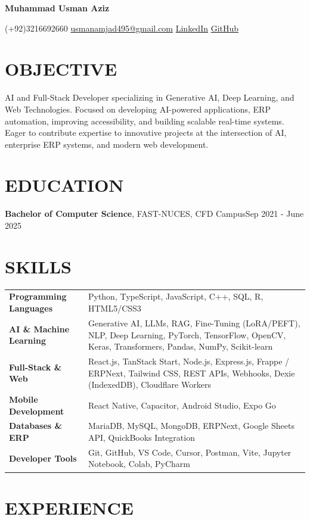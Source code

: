 \documentclass[11pt]{article}
\newcommand{\name}[1]{\begin{center}{\Huge \bfseries #1}\end{center}}
\newcommand{\address}[1]{\begin{center}\small #1\end{center}\vspace{-8pt}}
\newcommand{\rSection}[1]{\section{\uppercase{#1}}}
\begin{document}
\pagestyle{empty}

\name{Muhammad Usman Aziz}

\address{
\faPhone{} (+92)3216692660 \quad
\faEnvelope{} \href{mailto:usmanamjad495@gmail.com}{usmanamjad495@gmail.com} \quad
\faLinkedin{} \href{https://www.linkedin.com/in/usmanamjad41/}{LinkedIn} \quad
\faGithub{} \href{https://github.com/MaAn-41}{GitHub}
}

\rSection{Objective}
AI and Full-Stack Developer specializing in Generative AI, Deep Learning, and Web Technologies. Focused on developing AI-powered applications, ERP automation, improving accessibility, and building scalable real-time systems. Eager to contribute expertise to innovative projects at the intersection of AI, enterprise ERP systems, and modern web development.

\rSection{Education}
{\bf Bachelor of Computer Science}, FAST-NUCES, CFD Campus\hfill {Sep 2021 - June 2025}

\vspace{-1em}

\rSection{Skills}
\begin{tabularx}{\textwidth}{ @{} >{\bfseries}l @{\hspace{3ex}} X @{} }
Programming Languages & Python, TypeScript, JavaScript, C++, SQL, R, HTML5/CSS3 \\
AI \& Machine Learning & Generative AI, LLMs, RAG, Fine-Tuning (LoRA/PEFT), NLP, Deep Learning, PyTorch, TensorFlow, OpenCV, Keras, Transformers, Pandas, NumPy, Scikit-learn \\
Full-Stack \& Web & React.js, TanStack Start, Node.js, Express.js, Frappe / ERPNext, Tailwind CSS, REST APIs, Webhooks, Dexie (IndexedDB), Cloudflare Workers \\
Mobile Development & React Native, Capacitor, Android Studio, Expo Go \\
Databases \& ERP & MariaDB, MySQL, MongoDB, ERPNext, Google Sheets API, QuickBooks Integration \\
Developer Tools & Git, GitHub, VS Code, Cursor, Postman, Vite, Jupyter Notebook, Colab, PyCharm \\
\end{tabularx}

\rSection{Experience}
\end{document}
